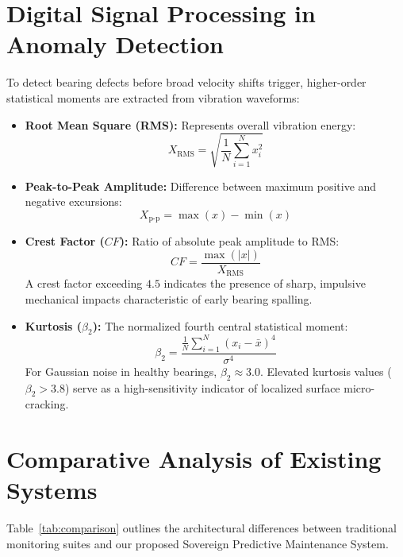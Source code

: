 \documentclass[12pt,a4paper,oneside]{report}
\begin{document}
\section{Digital Signal Processing in Anomaly Detection}
To detect bearing defects before broad velocity shifts trigger, higher-order statistical moments are extracted from vibration waveforms:
\begin{itemize}[leftmargin=*]
    \item \textbf{Root Mean Square (RMS):} Represents overall vibration energy:
    \begin{equation}
        X_{\text{RMS}} = \sqrt{\frac{1}{N} \sum_{i=1}^N x_i^2}
    \end{equation}
    \item \textbf{Peak-to-Peak Amplitude:} Difference between maximum positive and negative excursions:
    \begin{equation}
        X_{\text{p-p}} = \max(x) - \min(x)
    \end{equation}
    \item \textbf{Crest Factor ($CF$):} Ratio of absolute peak amplitude to RMS:
    \begin{equation}
        CF = \frac{\max(|x|)}{X_{\text{RMS}}}
    \end{equation}
    A crest factor exceeding $4.5$ indicates the presence of sharp, impulsive mechanical impacts characteristic of early bearing spalling.
    \item \textbf{Kurtosis ($\beta_2$):} The normalized fourth central statistical moment:
    \begin{equation}
        \beta_2 = \frac{\frac{1}{N}\sum_{i=1}^N (x_i - \bar{x})^4}{\sigma^4}
    \end{equation}
    For Gaussian noise in healthy bearings, $\beta_2 \approx 3.0$. Elevated kurtosis values ($\beta_2 > 3.8$) serve as a high-sensitivity indicator of localized surface micro-cracking.
\end{itemize}

\section{Comparative Analysis of Existing Systems}
Table~\ref{tab:comparison} outlines the architectural differences between traditional monitoring suites and our proposed Sovereign Predictive Maintenance System.
\end{document}
